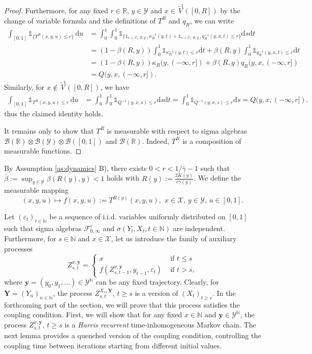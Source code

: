 \documentclass[a4paper,10pt]{article}
\newcommand{\N}{\mathbb{N}}
\newcommand{\R}{\mathbb{R}}
\newcommand{\B}{\mathcal{B}}
\newcommand{\F}{\mathcal{F}}
\newcommand{\X}{\mathcal{X}}
\newcommand{\Y}{\mathcal{Y}}
\newcommand{\ind}{\mathds{1}}
\newcommand{\eps}{\varepsilon}
\newcommand{\ga}{\gamma}
\newcommand{\ka}{\kappa}
\newcommand{\dint}{\mathrm{d}}  %
\begin{document}
\begin{proof}
Furthermore, for any fixed $r\in\R$, $y\in\Y$ and $x\in\stackrel{-1}{V}([0,R])$
by the change of variable formula and the definitions of $T^R$ and $q_R$, we can write
\begin{align*}
	\int_{[0,1]}\ind_{\{T^R (x,y,u)\le r\}}\,\dint u 
	&=
	\int_0^1 \int_0^1
	\ind_{\{\ind_{s\ge \beta (R,y)}\ka_R^{-1}(y,t)
	+\ind_{s<\beta (R,y)} q_R^{-1}(y,x,t)\le r\}} \dint s \dint t
	\\
	&=
	(1-\beta (R,y))\int_0^1 \ind_{\ka_R^{-1}(y,t)\le r}\dint t +
	\beta (R,y) \int_0^1 \ind_{q_R^{-1}(y,x,t)\le r}\dint t
	\\
	&=
	(1-\beta (R,y))\ka_R (y,(-\infty,r]) + \beta (R,y) q_R(y,x,(-\infty,r])
	\\
	&=Q(y,x, (-\infty,r]).
\end{align*}
Similarly, for $x\notin\stackrel{-1}{V}([0,R])$, we have
\begin{align*}
\int_{[0,1]}\ind_{T^R (x,y,u)\le r}\,\dint u 
&=
\int_0^1 \int_0^1 
\ind_{Q^{-1}(y,x,s)\le r}\dint s\dint t 
= \int_0^1 
\ind_{Q^{-1}(y,x,s)\le r}\dint s = Q(y,x, (-\infty,r]).
\end{align*}
thus the claimed identity holds.

It remains only to show that $T^R$ is measurable with respect to sigma algebras $\B (\R)\otimes\B (\Y)\otimes \B ([0,1])$ and $\B (\R)$. Indeed, $T^R$ is a composition of measurable functions. 
\end{proof}

By Assumption \ref{as:dynamics} B), there exists $0<r<1/\bar{\ga}-1$ such that 
$
\bar{\beta}:=\sup_{y\in\Y} \beta (R(y),y)<1
$
holds with $R(y):=\frac{2K(y)}{r\ga (y)}$.
We define the measurable mapping 
\begin{equation}\label{eq:fgood}
	(x,y,u)\mapsto f(x,y,u):=T^{R(y)}(x,y,u),\,\,
	x\in\X,\,y\in\Y,\,u\in [0,1].
\end{equation}

Let $(\eps_t)_{t\in\N}$ be a sequence of i.i.d. variables uniformly distributed on $[0,1]$ such that sigma algebras $\F^{\eps}_{0,\infty}$ and $\sigma (Y_t, X_t, t\in\N)$ are independent. 
Furthermore, for $s\in\N$ and $x\in\X$, let us introduce the family of auxiliary processes
\begin{equation}\label{eq:Zaux}
Z_{s,t}^{x,\mathbf{y}} = \begin{cases}
x &\text{ if } t\le s \\
f(Z_{s,t-1}^{x,\mathbf{y}},y_{t-1},\eps_t) &\text{ if } t>s,
\end{cases}
\end{equation}
where $\mathbf{y}=(y_0,y_1,\ldots)\in\Y^\N$ can be any fixed trajectory. Clearly, for  $\mathbf{Y}=(Y_n)_{n\in\N}$, the process $Z_{s,t}^{X_s,\mathbf{Y}}$, ${t\ge s}$ is a version of $(X_t)_{t\ge s}$. In the forthcoming part of the section, we will prove that this process satisfies the coupling condition. First, we will show that for any fixed $x\in\N$ and $\mathbf{y}\in\Y^\N$, the process $Z_{s,t}^{x, \mathbf{y}}$, $t\ge s$ is a \emph{Harris recurrent} time-inhomogeneous Markov chain. The next lemma provides a quenched version of the coupling condition, controlling the coupling time between iterations starting from different initial values.
\end{document}
